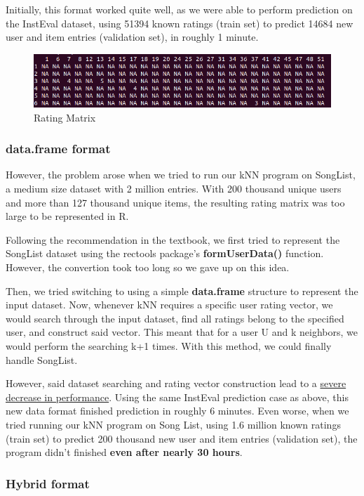 \documentclass{article}
\begin{document}
Initially, this format worked quite well, as we were able to perform prediction on the InstEval dataset, using 51394 known ratings (train set) to predict 14684 new user and item entries (validation set), in roughly 1 minute. 

\begin{figure}[ht]
\centering
\includegraphics[scale=0.5]{Matrix.png}
\caption{Rating Matrix}
\label{fig:universe}
\end{figure}

\subsubsection{data.frame format}

However, the problem arose when we tried to run our kNN program on SongList, a medium size dataset with 2 million entries. With 200 thousand unique users and more than 127 thousand unique items, the resulting rating matrix was too large to be represented in R.

Following the recommendation in the textbook, we first tried to represent the SongList dataset using the rectools package's \textbf{formUserData()} function. However, the convertion took too long so we gave up on this idea.

Then, we tried switching to using a simple \textbf{data.frame} structure to represent the input dataset. Now, whenever kNN requires a specific user rating vector, we would search through the input dataset, find all ratings belong to the specified user, and construct said vector. This meant that for a user U and k neighbors, we would perform the searching k+1 times. With this method, we could finally handle SongList. 

However, said dataset searching and rating vector construction lead to a \underline{severe decrease in performance}. Using the same InstEval prediction case as above, this new data format finished prediction in roughly 6 minutes. Even worse, when we tried running our kNN program on Song List, using 1.6 million known ratings (train set) to predict 200 thousand new user and item entries (validation set), the program didn't finished \textbf{even after nearly 30 hours}.

\subsubsection{Hybrid format}
\end{document}

